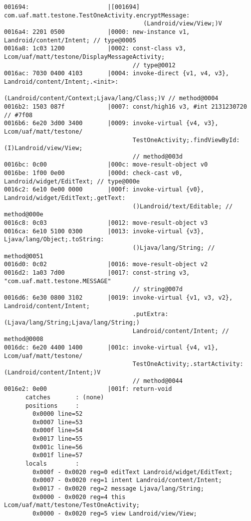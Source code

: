 \begin{lstlisting}
001694:                      |[001694] com.uaf.matt.testone.TestOneActivity.encryptMessage:
                                       (Landroid/view/View;)V
0016a4: 2201 0500            |0000: new-instance v1, Landroid/content/Intent; // type@0005
0016a8: 1c03 1200            |0002: const-class v3, Lcom/uaf/matt/testone/DisplayMessageActivity;
                                    // type@0012
0016ac: 7030 0400 4103       |0004: invoke-direct {v1, v4, v3}, Landroid/content/Intent;.<init>:
                                    (Landroid/content/Context;Ljava/lang/Class;)V // method@0004
0016b2: 1503 087f            |0007: const/high16 v3, #int 2131230720 // #7f08
0016b6: 6e20 3d00 3400       |0009: invoke-virtual {v4, v3}, Lcom/uaf/matt/testone/
                                    TestOneActivity;.findViewById:(I)Landroid/view/View;
                                    // method@003d
0016bc: 0c00                 |000c: move-result-object v0
0016be: 1f00 0e00            |000d: check-cast v0, Landroid/widget/EditText; // type@000e
0016c2: 6e10 0e00 0000       |000f: invoke-virtual {v0}, Landroid/widget/EditText;.getText:
                                    ()Landroid/text/Editable; // method@000e
0016c8: 0c03                 |0012: move-result-object v3
0016ca: 6e10 5100 0300       |0013: invoke-virtual {v3}, Ljava/lang/Object;.toString:
                                    ()Ljava/lang/String; // method@0051
0016d0: 0c02                 |0016: move-result-object v2
0016d2: 1a03 7d00            |0017: const-string v3, "com.uaf.matt.testone.MESSAGE"
                                    // string@007d
0016d6: 6e30 0800 3102       |0019: invoke-virtual {v1, v3, v2}, Landroid/content/Intent;
                                    .putExtra:(Ljava/lang/String;Ljava/lang/String;)
                                    Landroid/content/Intent; // method@0008
0016dc: 6e20 4400 1400       |001c: invoke-virtual {v4, v1}, Lcom/uaf/matt/testone/
                                    TestOneActivity;.startActivity:(Landroid/content/Intent;)V
                                    // method@0044
0016e2: 0e00                 |001f: return-void
      catches       : (none)
      positions     :
        0x0000 line=52
        0x0007 line=53
        0x000f line=54
        0x0017 line=55
        0x001c line=56
        0x001f line=57
      locals        :
        0x000f - 0x0020 reg=0 editText Landroid/widget/EditText;
        0x0007 - 0x0020 reg=1 intent Landroid/content/Intent;
        0x0017 - 0x0020 reg=2 message Ljava/lang/String;
        0x0000 - 0x0020 reg=4 this Lcom/uaf/matt/testone/TestOneActivity;
        0x0000 - 0x0020 reg=5 view Landroid/view/View;


\end{lstlisting}
